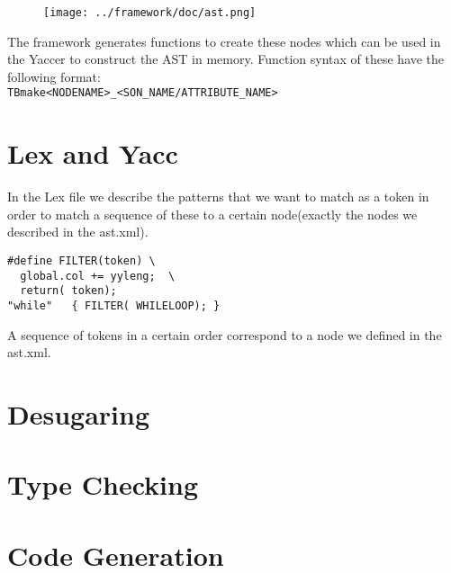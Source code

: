 \documentclass[a4paper]{article}
\begin{document}
\begin{figure}[h!]
    \texttt{[image: ../framework/doc/ast.png]}
\label{fig:ast.png}
\end{figure}

The framework generates functions to create these nodes which can be
used in the Yaccer to construct the AST in memory. Function syntax of these
have the following format: \\
\texttt{TBmake<NODENAME>\_<SON\_NAME/ATTRIBUTE\_NAME>}

\section{Lex and Yacc}
In the Lex file we describe the patterns that we want to match as a token in
order to match a sequence of these to a certain node(exactly the nodes we
described in the ast.xml).
\begin{lstlisting}
#define FILTER(token) \
  global.col += yyleng;  \
  return( token);
"while"   { FILTER( WHILELOOP); }
\end{lstlisting}
A sequence of tokens in a certain order correspond to a node we defined in the
ast.xml.

\section{Desugaring}

\section{Type Checking}

\section{Code Generation}
\end{document}
